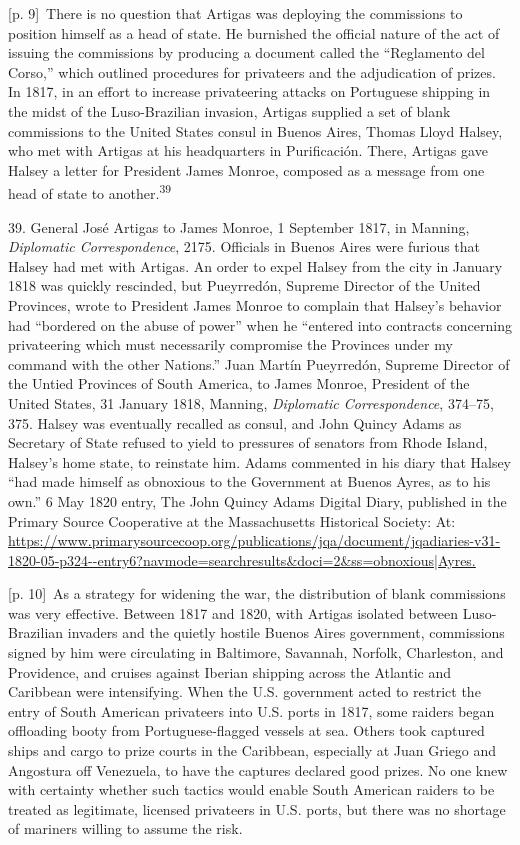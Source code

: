 \documentclass[10pt,a4paper]{article}
\begin{document}
{\scriptsize\color{gray} [p. 9]}\ There is no question that Artigas was deploying the commissions to position himself as a head of state. He burnished the official nature of the act of issuing the commissions by producing a document called the “Reglamento del Corso,” which outlined procedures for privateers and the adjudication of prizes. In 1817, in an effort to increase privateering attacks on Portuguese shipping in the midst of the Luso-Brazilian invasion, Artigas supplied a set of blank commissions to the United States consul in Buenos Aires, Thomas Lloyd Halsey, who met with Artigas at his headquarters in Purificación. There, Artigas gave Halsey a letter for President James Monroe, composed as a message from one head of state to another.\nobreak\textsuperscript{39}\par{\small 39. General José Artigas to James Monroe, 1 September 1817, in Manning, \textit{Diplomatic Correspondence}, 2175. Officials in Buenos Aires were furious that Halsey had met with Artigas. An order to expel Halsey from the city in January 1818 was quickly rescinded, but Pueyrredón, Supreme Director of the United Provinces, wrote to President James Monroe to complain that Halsey’s behavior had “bordered on the abuse of power” when he “entered into contracts concerning privateering which must necessarily compromise the Provinces under my command with the other Nations.” Juan Martín Pueyrredón, Supreme Director of the Untied Provinces of South America, to James Monroe, President of the United States, 31 January 1818, Manning, \textit{Diplomatic Correspondence}, 374–75, 375. Halsey was eventually recalled as consul, and John Quincy Adams as Secretary of State refused to yield to pressures of senators from Rhode Island, Halsey’s home state, to reinstate him. Adams commented in his diary that Halsey “had made himself as obnoxious to the Government at Buenos Ayres, as to his own.” 6 May 1820 entry, The John Quincy Adams Digital Diary, published in the Primary Source Cooperative at the Massachusetts Historical Society: At: \url{https://www.primarysourcecoop.org/publications/jqa/document/jqadiaries-v31-1820-05-p324--entry6?navmode=searchresults&doci=2&ss=obnoxious|Ayres.}\par}
{\scriptsize\color{gray} [p. 10]}\ As a strategy for widening the war, the distribution of blank commissions was very effective. Between 1817 and 1820, with Artigas isolated between Luso-Brazilian invaders and the quietly hostile Buenos Aires government, commissions signed by him were circulating in Baltimore, Savannah, Norfolk, Charleston, and Providence, and cruises against Iberian shipping across the Atlantic and Caribbean were intensifying. When the U.S. government acted to restrict the entry of South American privateers into U.S. ports in 1817, some raiders began offloading booty from Portuguese-flagged vessels at sea. Others took captured ships and cargo to prize courts in the Caribbean, especially at Juan Griego and Angostura off Venezuela, to have the captures declared good prizes. No one knew with certainty whether such tactics would enable South American raiders to be treated as legitimate, licensed privateers in U.S. ports, but there was no shortage of mariners willing to assume the risk.\par
\end{document}
